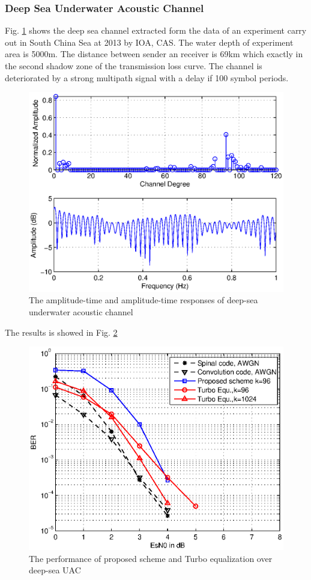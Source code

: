 \documentclass[conference]{IEEEtran}
\begin{document}
\subsubsection{Deep Sea Underwater Acoustic Channel}
Fig. \ref{fig_DeepChannel} shows the deep sea channel extracted form the data of an experiment carry out in South China Sea at 2013 by IOA, CAS. The water depth of experiment area is 5000m. The distance between sender an receiver is 69km which exactly in the second  shadow zone of  the transmission loss curve. The channel is deteriorated by a strong multipath signal  with a delay if 100 symbol periods.

\begin{figure}[!t]
\centering
\includegraphics[width=3 in]{DeepChannel.eps}
\caption{The amplitude-time and amplitude-time responses of deep-sea underwater acoustic channel}
\label{fig_DeepChannel}
\end{figure}
The results is showed in Fig. \ref{fig_DeepQPSKComparison} 

\begin{figure}[!t]
\centering
\includegraphics[width=3.5 in]{DeepQPSKComparison.eps}
\caption{The performance of proposed scheme and Turbo equalization over deep-sea UAC}
\label{fig_DeepQPSKComparison}
\end{figure}
\end{document}
